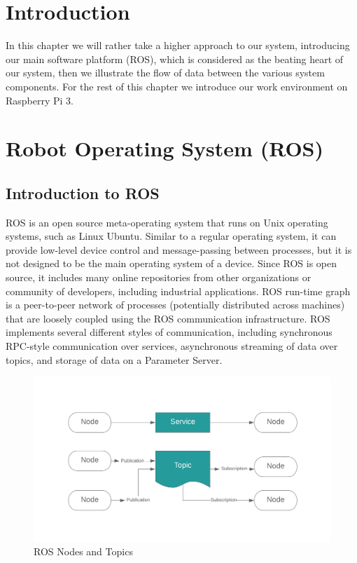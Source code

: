 \newline
\newline
\vspace{3mm}
\hfill
\section{Introduction}
\hspace{2cm}In this chapter we will rather take a higher approach to our system, introducing our main software platform (ROS), which is considered as the beating heart of our system, then we illustrate the flow of data between the various system components. For the rest of this chapter we introduce our work environment on Raspberry Pi 3.

\section{Robot Operating System (ROS)}

\subsection{Introduction to ROS}
\hspace{2cm}ROS is an open source meta-operating system that runs on Unix operating systems, such as Linux Ubuntu. Similar to a regular operating system, it can provide low-level device control and message-passing between processes, but it is not designed to be the main operating system of a device. Since ROS is open source, it includes many online repositories from other organizations or community of developers, including industrial applications. ROS run-time graph is a peer-to-peer network of processes (potentially distributed across machines) that are loosely coupled using the ROS communication infrastructure. ROS implements several different styles of communication, including synchronous RPC-style communication over services, asynchronous streaming of data over topics, and storage of data on a Parameter Server.\cite{web040}

\begin{figure}[H]%
    \center%
    \includegraphics[width=1\textwidth]{images/Dada/RosNodesandTopics.png}%
    \caption[ROS Nodes and Topics]{ROS Nodes and Topics}\label{fig: ROS Nodes and Topics}%
  \end{figure}
  
